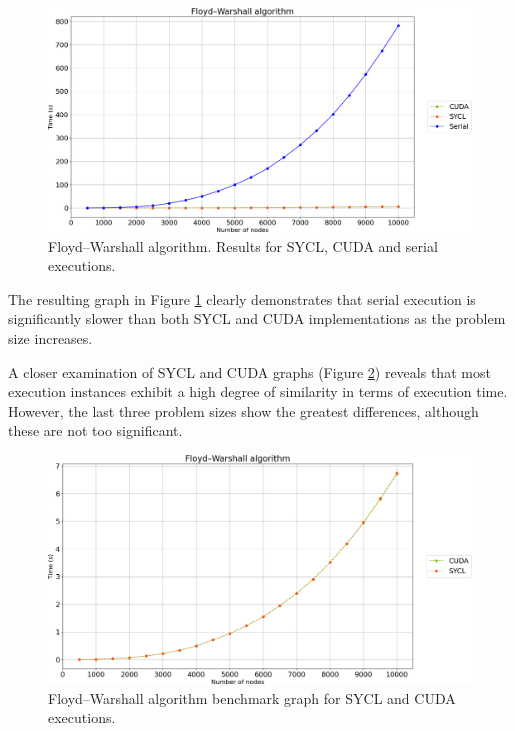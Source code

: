 \begin{figure}[H]
	\centering
	\includegraphics[width=\linewidth]{images/floydwarshall-sycl-cuda-serial.png}
	\caption{Floyd–Warshall algorithm. Results for SYCL, CUDA and serial executions.}
	\label{fig:floydwarshall-benchmark-all}
\end{figure}

The resulting graph in Figure \ref{fig:floydwarshall-benchmark-all} clearly demonstrates that serial execution is significantly slower than both SYCL and CUDA implementations as the problem size increases.

A closer examination of SYCL and CUDA graphs (Figure \ref{fig:floydwarshall-benchmark-parallel}) reveals that most execution instances exhibit a high degree of similarity in terms of execution time.
However, the last three problem sizes show the greatest differences, although these are not too significant.

\begin{figure}[H]
	\centering
	\includegraphics[width=\linewidth]{images/floydwarshall-sycl-cuda.png}
	\caption{Floyd–Warshall algorithm benchmark graph for SYCL and CUDA executions.}
	\label{fig:floydwarshall-benchmark-parallel}
\end{figure}

